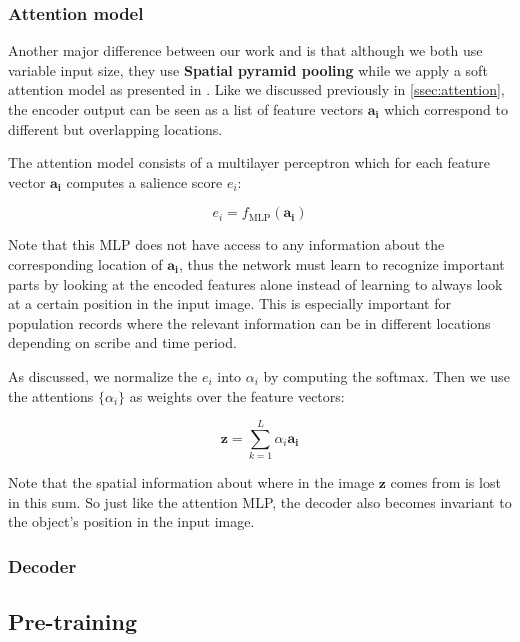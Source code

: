 


\subsubsection{Attention model}

Another major difference between our work and \cite{FornesCnnCategorization} is that although we both use variable input size, they use \textbf{Spatial pyramid pooling} while we apply a soft attention model as presented in \cite{AttendAndTell}. Like we discussed previously in \ref{ssec:attention}, the encoder output can be seen as a list of feature vectors $\mathbf{a_i}$ which correspond to different but overlapping locations.

The attention model consists of a multilayer perceptron which for each feature vector $\mathbf{a_i}$ computes a salience score $e_i$:

\[
e_i = f_\text{MLP}(\mathbf{a_i})
\]

Note that this MLP does not have access to any information about the corresponding location of $\mathbf{a_i}$, thus the network must learn to recognize important parts by looking at the encoded features alone instead of learning to always look at a certain position in the input image. This is especially important for population records where the relevant information can be in different locations depending on scribe and time period.

As discussed, we normalize the $e_i$ into $\alpha_i$ by computing the softmax. Then we use the attentions $\{\alpha_i\}$ as weights over the feature vectors:

\[
\mathbf{z} = \sum_{k=1}^L \alpha_i \mathbf{a_i}
\]

Note that the spatial information about where in the image $\mathbf{z}$ comes from is lost in this sum. So just like the attention MLP, the decoder also becomes invariant to the object's position in the input image.

\subsubsection{Decoder}





\subsection{Pre-training}

